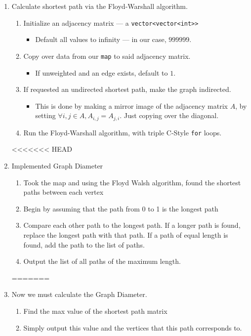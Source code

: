 \documentclass{article}
\newcommand{\shellcmd}[1]{\texttt{\colorbox{gray!30}{#1}}}
\begin{document}
\begin{enumerate}
    \item Calculate shortest path via the Floyd-Warshall algorithm.
    \begin{enumerate}
        \item Initialize an adjacency matrix --- a \shellcmd{vector<vector<int>>}
        \begin{itemize}
            \item Default all values to infinity --- in our case, $999999$.
        \end{itemize}
        \item Copy over data from our \shellcmd{map} to said adjacency matrix.
        \begin{itemize}
            \item If unweighted and an edge exists, default to $1$.
        \end{itemize}
        \item If requested an undirected shortest path, make the graph indirected.
        \begin{itemize}
            \item This is done by making a mirror image of the adjacency matrix $A$, by setting $\forall i, j \in A, A_{i, j} = A_{j, i}$. Just copying over the diagonal.
        \end{itemize}
        \item Run the Floyd-Warshall algorithm, with triple C-Style \shellcmd{for} loops.
    \end{enumerate}

<<<<<<< HEAD
    \item Implemented Graph Diameter
    \begin{enumerate}
        \item Took the map and using the Floyd Walsh algorithm, found the shortest paths between each vertex
        \item Begin by assuming that the path from 0 to 1 is the longest path
        \item Compare each other path to the longest path. If a longer path is found, replace the longest path with that path. If a path of equal length is found, add the path to the list of paths.
        \item Output the list of all paths of the maximum length.
    \end{enumerate}
=======
    \item Now we must calculate the Graph Diameter.
    \begin{enumerate}
        \item Find the max value of the shortest path matrix
        \item Simply output this value and the vertices that this path corresponds to.
    \end{enumerate}
        

\end{enumerate}
\end{document}
